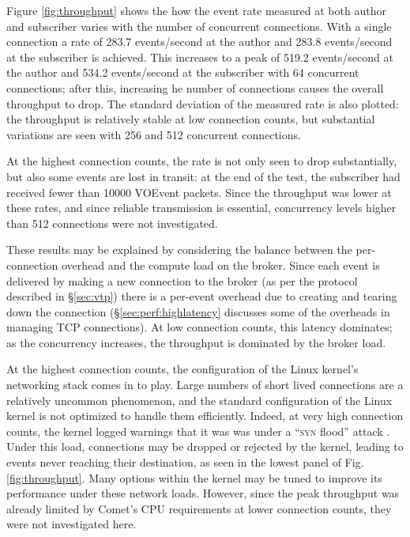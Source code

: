 \documentclass[5p,authoryear]{elsarticle}
\begin{document}
Figure \ref{fig:throughput} shows the how the event rate measured at both
author and subscriber varies with the number of concurrent connections. With a
single connection a rate of 283.7 events/second at the author and 283.8
events/second at the subscriber is achieved. This increases to a peak of 519.2
events/second at the author and 534.2 events/second at the subscriber with 64
concurrent connections; after this, increasing he number of connections causes
the overall throughput to drop. The standard deviation of the measured rate is
also plotted: the throughput is relatively stable at low connection counts,
but substantial variations are seen with 256 and 512 concurrent connections.

At the highest connection counts, the rate is not only seen to drop
substantially, but also some events are lost in transit: at the end of the
test, the subscriber had received fewer than 10000 VOEvent packets. Since the
throughput was lower at these rates, and since reliable transmission is
essential, concurrency levels higher than 512 connections were not
investigated.

These results may be explained by considering the balance between the
per-connection overhead and the compute load on the broker. Since each event
is delivered by making a new connection to the broker (as per the protocol
described in \S\ref{sec:vtp}) there is a per-event overhead due to creating
and tearing down the connection (\S\ref{sec:perf:highlatency} discusses some
of the overheads in managing TCP connections). At low connection counts, this
latency dominates; as the concurrency increases, the throughput is dominated
by the broker load.

At the highest connection counts, the configuration of the Linux kernel's
networking stack comes in to play. Large numbers of short lived connections
are a relatively uncommon phenomenon, and the standard configuration of the
Linux kernel is not optimized to handle them efficiently. Indeed, at very high
connection counts, the kernel logged warnings that it was was under a
``\textsc{syn} flood'' attack \citep{CERT:1996}. Under this load, connections
may be dropped or rejected by the kernel, leading to events never reaching
their destination, as seen in the lowest panel of Fig. \ref{fig:throughput}.
Many options within the kernel may be tuned to improve its performance under
these network loads. However, since the peak throughput was already limited by
Comet's CPU requirements at lower connection counts, they were not
investigated here.
\end{document}

